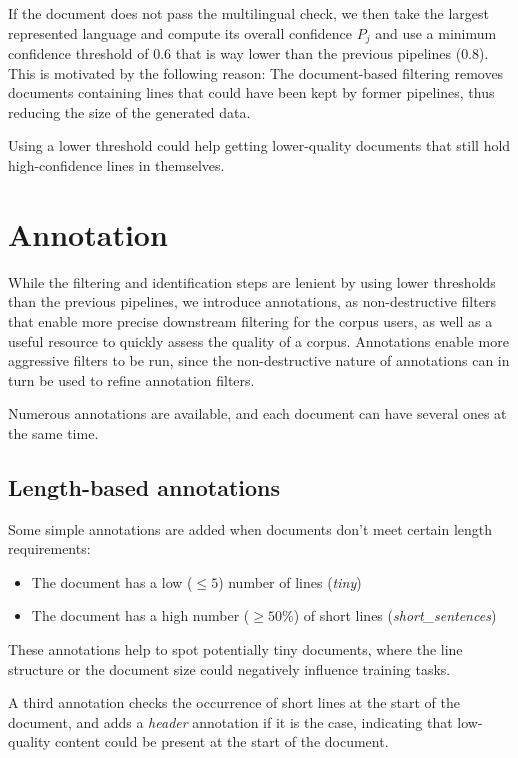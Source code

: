 If the document does not pass the multilingual check, we then take the largest represented language and compute its overall confidence $P_j$ and use a minimum confidence threshold of $0.6$ that is way lower than the previous pipelines ($0.8$). This is motivated by the following reason: The document-based filtering removes documents containing lines that could have been kept by former pipelines, thus reducing the size of the generated data.

Using a lower threshold could help getting lower-quality documents that still hold high-confidence lines in themselves.

\section{Annotation}

While the filtering and identification steps are lenient by using lower thresholds than the previous pipelines, we introduce annotations, as non-destructive filters that enable more precise downstream filtering for the corpus users, as well as a useful resource to quickly assess the quality of a corpus. Annotations enable more aggressive filters to be run, since the non-destructive nature of annotations can in turn be used to refine annotation filters.

Numerous annotations are available, and each document can have several ones at the same time.

\subsection{Length-based annotations}

Some simple annotations are added when documents don't meet certain length requirements:

\begin{itemize}
    \item The document has a low ($\le 5$) number of lines (\emph{tiny})
    \item The document has a high number ($\ge 50\%$) of short lines (\emph{short\_sentences})
\end{itemize}

These annotations help to spot potentially tiny documents, where the line structure or the document size could negatively influence training tasks.

A third annotation checks the occurrence of short lines at the start of the document, and adds a \emph{header} annotation if it is the case, indicating that low-quality content could be present at the start of the document.

